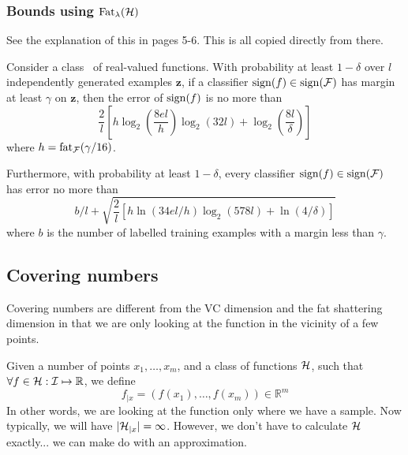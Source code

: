 \subsubsection{Bounds using $\mathrm{Fat}_{\lambda}(\mathcal{H})$}

See the explanation of this in \cite{Bartlett98a} pages 5-6.  This is
all copied directly from there.

\begin{theorem}
Consider a class \calF\ of real-valued functions.  With probability at
least $1 - \delta$ over $l$ independently generated examples
$\mathbf{z}$, if a classifier $\mathrm{sign} (f) \in \mathrm{sign} (\mathcal{F})$ has margin
at least $\gamma$ on $\mathbf{z}$, then the error of $\mathrm{sign} (f)$ is no
more than
\begin{equation}
\frac{2}{l} \left[ h \log_2 \left( \frac{8 e l}{h} \right) \log_2(32l)
+ \log_2 \left( \frac{8l}{\delta} \right) \right]
\end{equation}
where $h = \mathrm{fat}_{\mathcal{F}}(\gamma / 16)$.

Furthermore, with probability at least $1 - \delta$, every classifier
$\mathrm{sign} (f) \in \mathrm{sign} (\mathcal{F})$ has error no more than
\begin{equation}
b/l + \sqrt{\frac{2}{l} \left[ h \ln(34el/h) \log_2(578l) +
\ln(4/\delta) \right] }
\end{equation}
where $b$ is the number of labelled training examples with a margin
less than $\gamma$.
\end{theorem}



\subsection{Covering numbers}

Covering numbers are different from the VC dimension and the fat
shattering dimension in that we are only looking at the function in
the vicinity of a few points.

Given a number of points $x_1, \ldots, x_m$, and a class of functions
$\mathcal{H}$, such that $\forall f \in \mathcal{H} : \mathcal{I} \mapsto \mathbb{R}$,
we define 
%
\begin{equation}
f_{|x} = (f(x_1), \ldots, f(x_m)) \in \mathbb{R}^m
\end{equation}
%
In other words, we are looking at the function only where we have a
sample.  Now typically, we will have $|\mathcal{H}_{|x}| = \infty$.
However, we don't have to calculate $\mathcal{H}$ exactly... we can make do
with an approximation.

